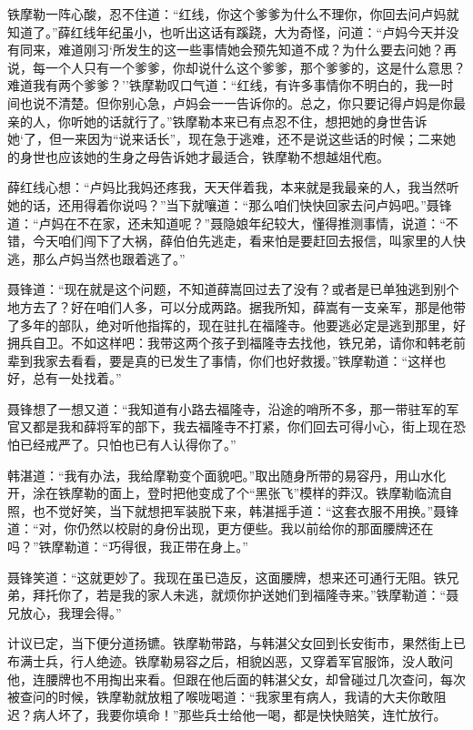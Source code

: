 \documentclass[12pt,oneside]{book}
\begin{document}
铁摩勒一阵心酸，忍不住道：``红线，你这个爹爹为什么不理你，你回去问卢妈就知道了。''薛红线年纪虽小，也听出这话有蹊跷，大为奇怪，问道：``卢妈今天并没有同来，难道刚习`所发生的这一些事情她会预先知道不成？为什么要去问她？再说，每一个人只有一个爹爹，你却说什么这个爹爹，那个爹爹的，这是什么意思？难道我有两个爹爹？''铁摩勒叹口气道：``红线，有许多事情你不明白的，我一时间也说不清楚。但你别心急，卢妈会一一告诉你的。总之，你只要记得卢妈是你最亲的人，你听她的话就行了。''铁摩勒本来已有点忍不住，想把她的身世告诉她`了，但一来因为``说来话长''，现在急于逃难，还不是说这些话的时候；二来她的身世也应该她的生身之母告诉她才最适合，铁摩勒不想越俎代庖。

薛红线心想：``卢妈比我妈还疼我，天天伴着我，本来就是我最亲的人，我当然听她的话，还用得着你说吗？''当下就嚷道：``那么咱们快快回家去问卢妈吧。''聂锋道：``卢妈在不在家，还未知道呢？''聂隐娘年纪较大，懂得推测事情，说道：``不错，今天咱们闯下了大祸，薛伯伯先逃走，看来怕是要赶回去报信，叫家里的人快逃，那么卢妈当然也跟着逃了。''

聂锋道：``现在就是这个问题，不知道薛嵩回过去了没有？或者是已单独逃到别个地方去了？好在咱们人多，可以分成两路。据我所知，薛嵩有一支亲军，那是他带了多年的部队，绝对听他指挥的，现在驻扎在福隆寺。他要逃必定是逃到那里，好拥兵自卫。不如这样吧：我带这两个孩子到福隆寺去找他，铁兄弟，请你和韩老前辈到我家去看看，要是真的已发生了事情，你们也好救援。''铁摩勒道：``这样也好，总有一处找着。''

聂锋想了一想又道：``我知道有小路去福隆寺，沿途的哨所不多，那一带驻军的军官又都是我和薛将军的部下，我去福隆寺不打紧，你们回去可得小心，街上现在恐怕已经戒严了。只怕也已有人认得你了。''

韩湛道：``我有办法，我给摩勒变个面貌吧。''取出随身所带的易容丹，用山水化开，涂在铁摩勒的面上，登时把他变成了个``黑张飞''模样的莽汉。铁摩勒临流自照，也不觉好笑，当下就想把军装脱下来，韩湛摇手道：``这套衣服不用换。''聂锋道：``对，你仍然以校尉的身份出现，更方便些。我以前给你的那面腰牌还在吗？''铁摩勒道：``巧得很，我正带在身上。''

聂锋笑道：``这就更妙了。我现在虽已造反，这面腰牌，想来还可通行无阻。铁兄弟，拜托你了，若是我的家人未逃，就烦你护送她们到福隆寺来。''铁摩勒道：``聂兄放心，我理会得。''

计议已定，当下便分道扬镳。铁摩勒带路，与韩湛父女回到长安街市，果然街上已布满士兵，行人绝迹。铁摩勒易容之后，相貌凶恶，又穿着军官服饰，没人敢问他，连腰牌也不用掏出来看。但跟在他后面的韩湛父女，却曾碰过几次查问，每次被查问的时候，铁摩勒就放粗了喉咙喝道：``我家里有病人，我请的大夫你敢阻迟？病人坏了，我要你填命！''那些兵士给他一喝，都是快快赔笑，连忙放行。
\end{document}
